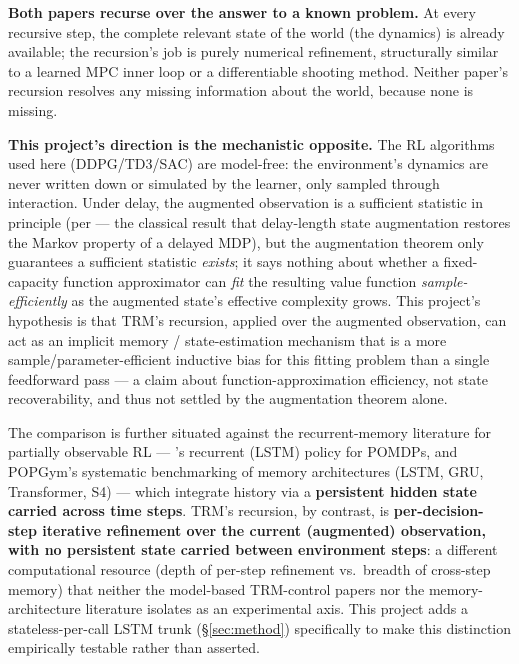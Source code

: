 \documentclass[11pt]{article}
\begin{document}
\textbf{Both papers recurse over the answer to a known problem.} At every recursive step, the complete relevant state of the world (the dynamics) is already available; the recursion's job is purely numerical refinement, structurally similar to a learned MPC inner loop or a differentiable shooting method. Neither paper's recursion resolves any missing information about the world, because none is missing.

\textbf{This project's direction is the mechanistic opposite.} The RL algorithms used here (DDPG/TD3/SAC) are model-free: the environment's dynamics are never written down or simulated by the learner, only sampled through interaction. Under delay, the augmented observation is a sufficient statistic in principle (per \citealp{katsikopoulos2003delayed} --- the classical result that delay-length state augmentation restores the Markov property of a delayed MDP), but the augmentation theorem only guarantees a sufficient statistic \emph{exists}; it says nothing about whether a fixed-capacity function approximator can \emph{fit} the resulting value function \emph{sample-efficiently} as the augmented state's effective complexity grows. This project's hypothesis is that TRM's recursion, applied over the augmented observation, can act as an implicit memory / state-estimation mechanism that is a more sample/parameter-efficient inductive bias for this fitting problem than a single feedforward pass --- a claim about function-approximation efficiency, not state recoverability, and thus not settled by the augmentation theorem alone.

The comparison is further situated against the recurrent-memory literature for partially observable RL --- \citet{bakker2007recurrent}'s recurrent (LSTM) policy for POMDPs, and POPGym's \citep{morad2023popgym} systematic benchmarking of memory architectures (LSTM, GRU, Transformer, S4) --- which integrate history via a \textbf{persistent hidden state carried across time steps}. TRM's recursion, by contrast, is \textbf{per-decision-step iterative refinement over the current (augmented) observation, with no persistent state carried between environment steps}: a different computational resource (depth of per-step refinement vs.\ breadth of cross-step memory) that neither the model-based TRM-control papers nor the memory-architecture literature isolates as an experimental axis. This project adds a stateless-per-call LSTM trunk (\S\ref{sec:method}) specifically to make this distinction empirically testable rather than asserted.
\end{document}
